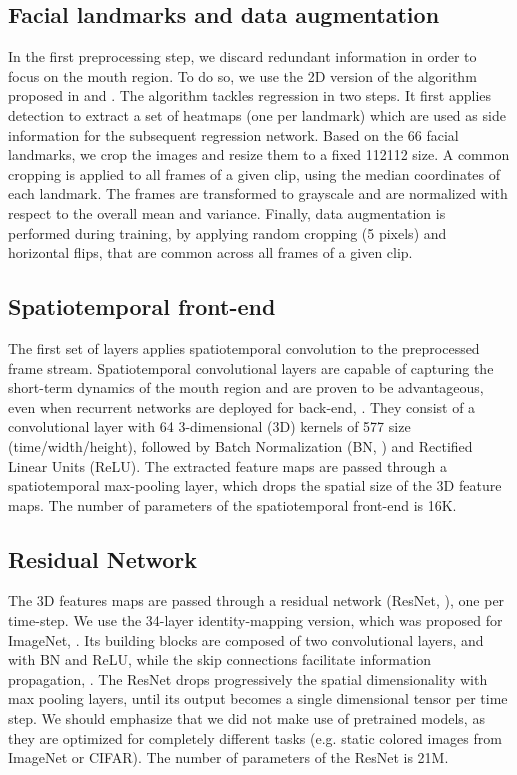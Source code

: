 \documentclass[a4paper]{article}
\begin{document}
\subsection{Facial landmarks and data augmentation}
In the first preprocessing step, we discard redundant information in order to focus on the mouth region. To do so, we use the 2D version of the algorithm proposed in \cite{bulat2016convolutional} and \cite{bulat2016two}. The algorithm tackles regression in two steps. It first applies detection to extract a set of heatmaps (one per landmark) which are used as side information for the subsequent regression network. Based on the 66 facial landmarks, we crop the images and resize them to a fixed 112112 size. A common cropping is applied to all frames of a given clip, using the median coordinates of each landmark. 
The frames are transformed to grayscale and are normalized with respect to the overall mean and variance. Finally, data augmentation is performed during training, by applying random cropping (5 pixels) and horizontal flips, that are common across all frames of a given clip. 
\subsection{Spatiotemporal front-end}
The first set of layers applies spatiotemporal convolution to the preprocessed frame stream. Spatiotemporal convolutional layers are capable of capturing the short-term dynamics of the mouth region and are proven to be advantageous, even when recurrent networks are deployed for back-end, \cite{assael2016lipnet}. They consist of a convolutional layer with 64 3-dimensional (3D) kernels of 577 size (time/width/height), followed by Batch Normalization (BN, \cite{ioffe2015batch}) and Rectified Linear Units (ReLU). The extracted feature maps are passed through a spatiotemporal max-pooling layer, which drops the spatial size of the 3D feature maps. The number of parameters of the spatiotemporal front-end is 16K.  

\subsection{Residual Network}
The 3D features maps are passed through a residual network (ResNet, \cite{he2016deep}), one per time-step. We use the 34-layer identity-mapping version, which was proposed for ImageNet, \cite{he2016identity}. Its building blocks are composed of two convolutional layers, and with BN and ReLU, while the skip connections facilitate information propagation, \cite{he2016identity}. The ResNet drops progressively the spatial dimensionality with max pooling layers, until its output becomes a single dimensional tensor per time step. We should emphasize that we did not make use of pretrained models, as they are optimized for completely different tasks (e.g. static colored images from ImageNet or CIFAR). The number of parameters of the ResNet is 21M. 
\end{document}
